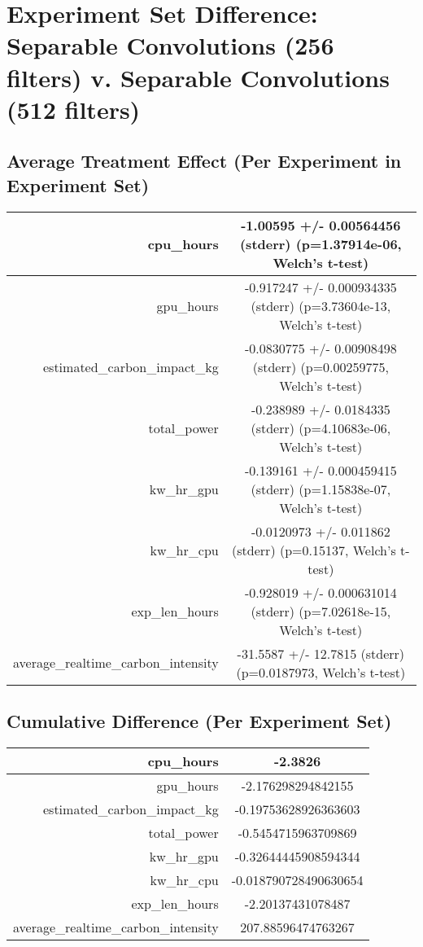 \documentclass{article}%
\begin{document}
%
\normalsize%
\section{Experiment Set Difference: Separable Convolutions (256 filters) v. Separable Convolutions (512 filters)}%
\label{sec:Experiment Set Difference Separable Convolutions (256 filters) v. Separable Convolutions (512 filters)}%
\subsection{Average Treatment Effect (Per Experiment in Experiment Set)}%
\label{subsec:Average Treatment Effect (Per Experiment in Experiment Set)}%
\begin{tabular}{|r|c|}%
\hline%
cpu\_hours&{-}1.00595 +/{-} 0.00564456 (stderr) (p=1.37914e{-}06, Welch's t{-}test)\\%
\hline%
gpu\_hours&{-}0.917247 +/{-} 0.000934335 (stderr) (p=3.73604e{-}13, Welch's t{-}test)\\%
\hline%
estimated\_carbon\_impact\_kg&{-}0.0830775 +/{-} 0.00908498 (stderr) (p=0.00259775, Welch's t{-}test)\\%
\hline%
total\_power&{-}0.238989 +/{-} 0.0184335 (stderr) (p=4.10683e{-}06, Welch's t{-}test)\\%
\hline%
kw\_hr\_gpu&{-}0.139161 +/{-} 0.000459415 (stderr) (p=1.15838e{-}07, Welch's t{-}test)\\%
\hline%
kw\_hr\_cpu&{-}0.0120973 +/{-} 0.011862 (stderr) (p=0.15137, Welch's t{-}test)\\%
\hline%
exp\_len\_hours&{-}0.928019 +/{-} 0.000631014 (stderr) (p=7.02618e{-}15, Welch's t{-}test)\\%
\hline%
average\_realtime\_carbon\_intensity&{-}31.5587 +/{-} 12.7815 (stderr) (p=0.0187973, Welch's t{-}test)\\%
\hline%
\end{tabular}

%
\subsection{Cumulative Difference (Per Experiment Set)}%
\label{subsec:Cumulative Difference (Per Experiment Set)}%
\begin{tabular}{|r|c|}%
\hline%
cpu\_hours&{-}2.3826\\%
\hline%
gpu\_hours&{-}2.176298294842155\\%
\hline%
estimated\_carbon\_impact\_kg&{-}0.19753628926363603\\%
\hline%
total\_power&{-}0.5454715963709869\\%
\hline%
kw\_hr\_gpu&{-}0.32644445908594344\\%
\hline%
kw\_hr\_cpu&{-}0.018790728490630654\\%
\hline%
exp\_len\_hours&{-}2.20137431078487\\%
\hline%
average\_realtime\_carbon\_intensity&207.88596474763267\\%
\hline%
\end{tabular}

%
\end{document}
